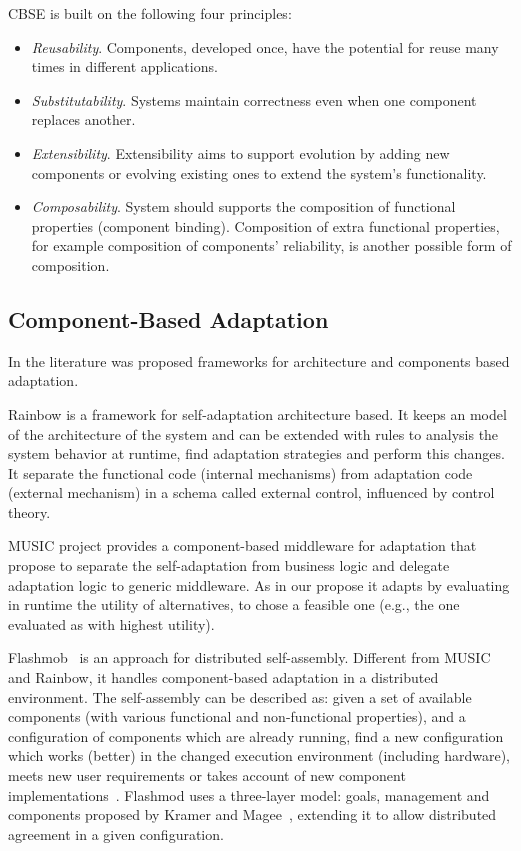 CBSE is built on the following four principles\cite{crnkovic_software_2011}:
\begin{itemize}
  \item \emph{Reusability}. Components, developed once, have the potential for reuse many times in different applications.
  \item \emph{Substitutability}. Systems maintain correctness even when one component replaces another.
  \item \emph{Extensibility}. Extensibility aims to support evolution by adding new components or evolving existing ones to extend the system’s functionality.
  \item \emph{Composability}. System should supports the composition of functional properties (component binding). Composition of extra functional properties, for example composition of components’ reliability, is another possible form of composition.
\end{itemize}

\subsection{Component-Based Adaptation}

In the literature was proposed frameworks for architecture and components based adaptation.

Rainbow\cite{garlan_rainbow:_2004} is a framework for self-adaptation architecture based. It keeps an model of the architecture of the system and can be extended with rules to analysis the system behavior at runtime, find adaptation strategies and perform this changes. It separate the functional code (internal mechanisms) from adaptation code (external mechanism) in a schema called external control, influenced by control theory.

MUSIC\cite{rouvoy_music:_2009} project provides a component-based middleware for adaptation that propose to separate the self-adaptation from business logic and delegate adaptation logic to generic middleware. As in our propose it adapts by evaluating in runtime the utility of alternatives, to chose a feasible one (e.g., the one evaluated as with highest utility).

Flashmob~\cite{sykes_flashmob:_2011} is an approach for distributed self-assembly. Different from MUSIC and Rainbow, it handles component-based adaptation in a distributed environment. The self-assembly can be described as: given a set of available components (with various functional and non-functional properties), and a configuration of components which are already running, find a new configuration which works (better) in the changed execution environment (including hardware),
meets new user requirements or takes account of new component implementations~\cite{sykes_flashmob:_2011}. Flashmod uses a three-layer model: goals, management and components proposed by Kramer and Magee~\cite{kramer_self-managed_2007}, extending it to allow distributed agreement in a given configuration.

